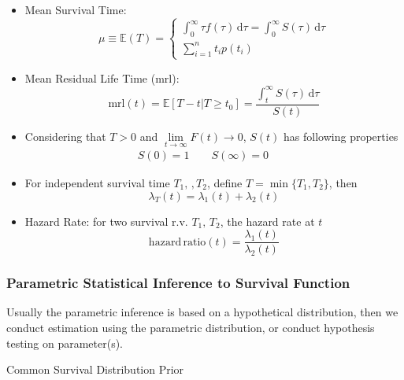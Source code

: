 \begin{itemize}[topsep=2pt,itemsep=0pt]
    \item Mean Survival Time:
    \begin{equation}
        \mu \equiv\mathbb{E}(T)=\begin{cases}
            \int _{0}^\infty \tau f(\tau) \,\mathrm{d}\tau =\int _0^\infty S(\tau) \,\mathrm{d}\tau\\
            \sum_{i=1}^nt_ip(t_i) 
        \end{cases}
    \end{equation}
    
    
    \item Mean Residual Life Time ($ \mathrm{mrl}  $):
    \begin{equation}
        \mathrm{mrl}(t)=\mathbb{E}[T-t|T\geq t_0]=\dfrac{\int _t^\infty S(\tau) \,\mathrm{d}\tau}{S(t)}  
    \end{equation}
    
    \item Considering that $ T>0 $ and $ \lim\limits_{t\to\infty}F(t)\to 0 $, $ S(t) $ has following properties
    \begin{align}
        S(0)=1\qquad S(\infty)=0\qquad
    \end{align}
    \item For independent survival time $ T_1,\,,T_2 $, define $ T=\min\{T_1,T_2\} $, then 
    \begin{equation}
        \lambda _T(t)=\lambda _1(t)+\lambda _2 (t)
    \end{equation}
    \item Hazard Rate: for two survival r.v. $ T_1,\,T_2 $, the hazard rate at $ t $
    \begin{equation}
        \mathrm{hazard\,ratio}(t)=\dfrac{\lambda_1(t) }{\lambda _2(t)}  
    \end{equation}
    
    
\end{itemize}


\subsubsection{Parametric Statistical Inference to Survival Function}
Usually the parametric inference is based on a hypothetical distribution, then we conduct estimation using the parametric distribution, or conduct hypothesis testing on parameter(s).

\begin{point}
    Common Survival Distribution Prior
\end{point}

